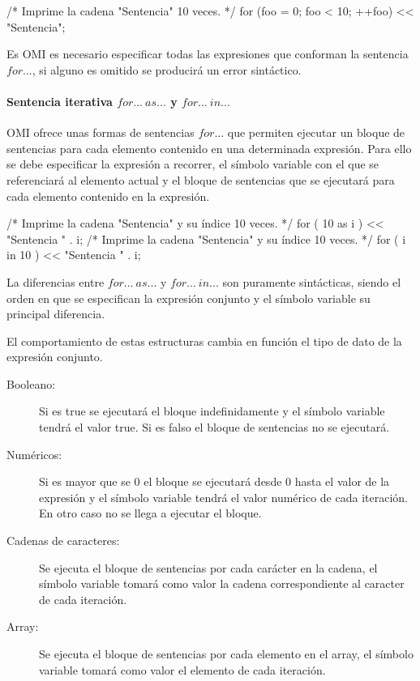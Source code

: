\begin{myverbatim}
   /*
      Imprime la cadena 
      "Sentencia" 10 veces.
   */
   for (foo = 0; foo < 10; ++foo){
      << "Sentencia"; 
   }
\end{myverbatim}

Es OMI es necesario especificar todas las expresiones que conforman la sentencia $for...$, si alguno es omitido se
producirá un error sintáctico.


\paragraph{Sentencia iterativa $for...\ as...$ y $for...\ in...$} \label{sec:stmt_foreach}

OMI ofrece unas formas de sentencias $for...$ que permiten ejecutar un bloque de sentencias para cada elemento contenido 
en una determinada expresión. Para ello se debe especificar la expresión a recorrer, el símbolo variable con el 
que se referenciará al elemento actual y el bloque de sentencias que se ejecutará para cada elemento contenido 
en la expresión. \\


\begin{myverbatim}
   /*
      Imprime la cadena 
      "Sentencia" y su índice 
      10 veces.
   */
   for ( 10 as i ){
      << "Sentencia " . i; 
   }
   /*
      Imprime la cadena 
      "Sentencia" y su índice
      10 veces.
   */
   for ( i in 10 ){
      << "Sentencia " . i; 
   }
\end{myverbatim}


La diferencias entre $for...\ as...$ y $for...\ in...$ son puramente sintácticas, siendo el orden en que se especifican la expresión conjunto y el
símbolo variable su principal diferencia.

El comportamiento de estas estructuras cambia en función el tipo de dato de la expresión conjunto. 

\begin{description}
\item [Booleano:] Si es true se ejecutará el bloque indefinidamente y el símbolo variable tendrá el valor true. Si es falso el bloque de sentencias no se ejecutará.
\item [Numéricos:] Si es mayor que se $0$ el bloque se ejecutará desde 0 hasta el valor de la expresión y el símbolo variable tendrá el valor numérico de cada iteración.
En otro caso no se llega a ejecutar el bloque.
\item [Cadenas de caracteres:] Se ejecuta el bloque de sentencias por cada carácter en la cadena, el símbolo variable tomará como valor la cadena correspondiente al 
caracter de cada iteración.
\item [Array:] Se ejecuta el bloque de sentencias por cada elemento en el array, el símbolo variable tomará como valor el elemento de cada iteración.
\end{description} 

